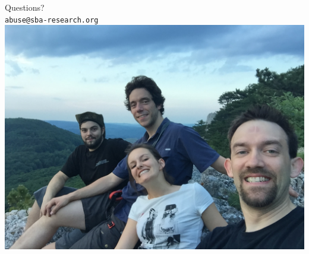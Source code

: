 \documentclass[14pt,aspectratio=43]{beamer}
\begin{document}
\begin{frame}
  \begin{center}
    \huge{Questions?}\\
    \small{\texttt{abuse@sba-research.org}}\\
    \includegraphics*[scale=0.2]{images/team.jpg}\\
  \end{center}
\end{frame}

\makeendpage
\end{document}
